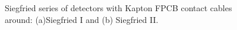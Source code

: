 \begin{figure}[tbhp]
\centering
{}\hfil %
%
\caption{Siegfried series of detectors with Kapton FPCB contact cables
around: (a)Siegfried I and (b) Siegfried II.}
\label{fig:ger:sies}
\end{figure}

